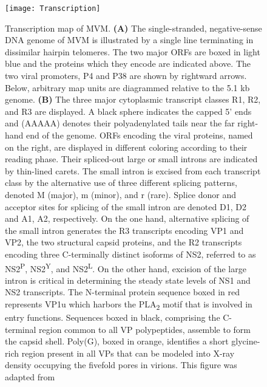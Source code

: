        







\begin{figure}
\centering
  \texttt{[image: Transcription]}
  \caption[Transcription map of MVM]
   {Transcription map of MVM. \textbf{(A)} The single-stranded, negative-sense DNA genome of MVM is illustrated by a single line terminating in dissimilar hairpin telomeres. The two major ORFs are boxed in light blue and the proteins which they encode are indicated above. The two viral promoters, P4 and P38 are shown by rightward arrows. Below, arbitrary map units are diagrammed relative to the 5.1 kb genome. \textbf{(B)} The three major cytoplasmic transcript classes R1, R2, and R3 are displayed. A black sphere indicates the capped 5’ ends and (AAAAA) denotes their polyadenylated tails near the far right-hand end of the genome. ORFs encoding the viral proteins, named on the right, are displayed in different coloring according to their reading phase. Their spliced-out large or small introns are indicated by thin-lined carets. The small intron is excised from each transcript class by the alternative use of three different splicing patterns, denoted M (major), m (minor), and r (rare). Splice donor and acceptor sites for splicing of the small intron are denoted D1, D2 and A1, A2, respectively. On the one hand, alternative splicing of the small intron generates the R3 transcripts encoding VP1 and VP2, the two structural capsid proteins, and the R2 transcripts encoding three C-terminally distinct isoforms of NS2, referred to as NS2\textsuperscript{P}, NS2\textsuperscript{Y}, and NS2\textsuperscript{L}. On the other hand, excision of the large intron is critical in determining the steady state levels of NS1 and NS2 transcripts. The N-terminal protein sequence boxed in red represents VP1u which harbors the PLA\textsubscript{2} motif that is involved in entry functions. Sequences boxed in black, comprising the C-terminal region common to all VP polypeptides, assemble to form the capsid shell. Poly(G), boxed in orange, identifies a short glycine-rich region present in all VPs that can be modeled into X-ray density occupying the fivefold pores in virions. This figure was adapted from \cite{small}}
\label{Transcription}
\end{figure}       




